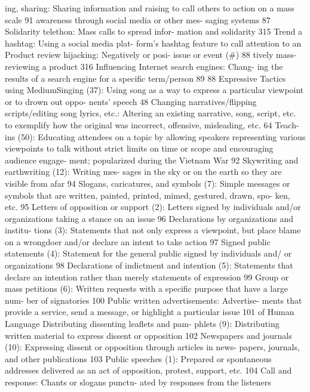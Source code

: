 \documentclass[twoside,a4paper,12pt,fleqn,openany]{extbook}
\begin{document}
ing, sharing: Sharing information and raising
 to call others to action on a mass scale
 91
awareness through social media or other mes-
saging systems
 87
 Solidarity telethon: Mass calls to spread infor-
mation and solidarity
 315
Trend a hashtag: Using a social media plat-
form’s hashtag feature to call attention to an
 Product review hijacking: Negatively or posi-
issue or event (#)
 88
 tively mass-reviewing a product
 316
Influencing Internet search engines: Chang-
ing the results of a search engine for a specific
term/person
 89
88
Expressive Tactics using MediumSinging (37): Using song as a way to express
a particular viewpoint or to drown out oppo-
nents’ speech
 48
Changing narratives/flipping scripts/editing
song lyrics, etc.: Altering an existing narrative,
song, script, etc. to exemplify how the original
was incorrect, offensive, misleading, etc. 64
Teach-ins (50): Educating attendees on a topic
by allowing speakers representing various
viewpoints to talk without strict limits on time
or scope and encouraging audience engage-
ment; popularized during the Vietnam War 92
Skywriting and earthwriting (12): Writing mes-
sages in the sky or on the earth so they are
visible from afar
 94
Slogans, caricatures, and symbols (7):
Simple messages or symbols that are written,
painted, printed, mimed, gestured, drawn, spo-
ken, etc.
 95
Letters of opposition or support (2): Letters
signed by individuals and/or organizations
taking a stance on an issue
 96
Declarations by organizations and institu-
tions (3): Statements that not only express a
viewpoint, but place blame on a wrongdoer
and/or declare an intent to take action
 97
Signed public statements (4): Statement for
the general public signed by individuals and/
or organizations
 98
Declarations of indictment and intention (5):
Statements that declare an intention rather
than merely statements of expression
 99
Group or mass petitions (6): Written requests
with a specific purpose that have a large num-
ber of signatories
 100
Public written advertisements: Advertise-
ments that provide a service, send a message,
or highlight a particular issue
 101
of Human Language
Distributing dissenting leaflets and pam-
phlets (9): Distributing written material to
express dissent or opposition
 102
Newspapers and journals (10): Expressing
dissent or opposition through articles in news-
papers, journals, and other publications 103
Public speeches (1): Prepared or spontaneous
addresses delivered as an act of opposition,
protest, support, etc.
 104
Call and response: Chants or slogans punctu-
ated by responses from the listeners
\end{document}
